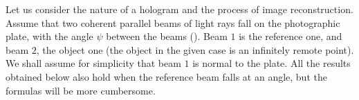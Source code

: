 Let us consider the nature of a hologram and the process of image reconstruction.
Assume that two coherent parallel beams of light rays fall on the photographic plate, with the angle $\psi$ between the beams ().
Beam $1$ is the reference one, and beam $2$, the object one (the object in the given case is an infinitely remote point).
We shall assume for simplicity that beam $1$ is normal to the plate.
All the results obtained below also hold when the reference beam falls at an angle, but the formulas will be more cumbersome.


